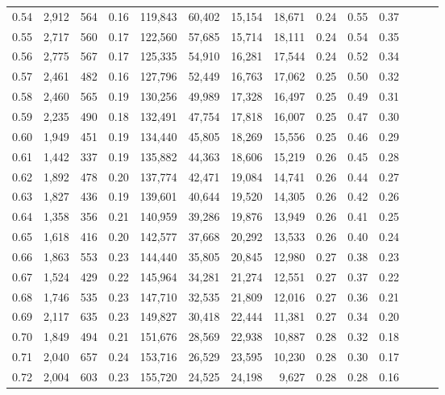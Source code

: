 \begin{tabular}{rrrrrrrrrrrrrr}
0.54 &  2,912 &  564 &  0.16 &  119,843 &   60,402 &  15,154 &  18,671 &  0.24 &  0.55 &      0.37 \\
0.55 &  2,717 &  560 &  0.17 &  122,560 &   57,685 &  15,714 &  18,111 &  0.24 &  0.54 &      0.35 \\
0.56 &  2,775 &  567 &  0.17 &  125,335 &   54,910 &  16,281 &  17,544 &  0.24 &  0.52 &      0.34 \\
0.57 &  2,461 &  482 &  0.16 &  127,796 &   52,449 &  16,763 &  17,062 &  0.25 &  0.50 &      0.32 \\
0.58 &  2,460 &  565 &  0.19 &  130,256 &   49,989 &  17,328 &  16,497 &  0.25 &  0.49 &      0.31 \\
0.59 &  2,235 &  490 &  0.18 &  132,491 &   47,754 &  17,818 &  16,007 &  0.25 &  0.47 &      0.30 \\
0.60 &  1,949 &  451 &  0.19 &  134,440 &   45,805 &  18,269 &  15,556 &  0.25 &  0.46 &      0.29 \\
0.61 &  1,442 &  337 &  0.19 &  135,882 &   44,363 &  18,606 &  15,219 &  0.26 &  0.45 &      0.28 \\
0.62 &  1,892 &  478 &  0.20 &  137,774 &   42,471 &  19,084 &  14,741 &  0.26 &  0.44 &      0.27 \\
0.63 &  1,827 &  436 &  0.19 &  139,601 &   40,644 &  19,520 &  14,305 &  0.26 &  0.42 &      0.26 \\
0.64 &  1,358 &  356 &  0.21 &  140,959 &   39,286 &  19,876 &  13,949 &  0.26 &  0.41 &      0.25 \\
0.65 &  1,618 &  416 &  0.20 &  142,577 &   37,668 &  20,292 &  13,533 &  0.26 &  0.40 &      0.24 \\
0.66 &  1,863 &  553 &  0.23 &  144,440 &   35,805 &  20,845 &  12,980 &  0.27 &  0.38 &      0.23 \\
0.67 &  1,524 &  429 &  0.22 &  145,964 &   34,281 &  21,274 &  12,551 &  0.27 &  0.37 &      0.22 \\
0.68 &  1,746 &  535 &  0.23 &  147,710 &   32,535 &  21,809 &  12,016 &  0.27 &  0.36 &      0.21 \\
0.69 &  2,117 &  635 &  0.23 &  149,827 &   30,418 &  22,444 &  11,381 &  0.27 &  0.34 &      0.20 \\
0.70 &  1,849 &  494 &  0.21 &  151,676 &   28,569 &  22,938 &  10,887 &  0.28 &  0.32 &      0.18 \\
0.71 &  2,040 &  657 &  0.24 &  153,716 &   26,529 &  23,595 &  10,230 &  0.28 &  0.30 &      0.17 \\
0.72 &  2,004 &  603 &  0.23 &  155,720 &   24,525 &  24,198 &   9,627 &  0.28 &  0.28 &      0.16 \\

\end{tabular}
